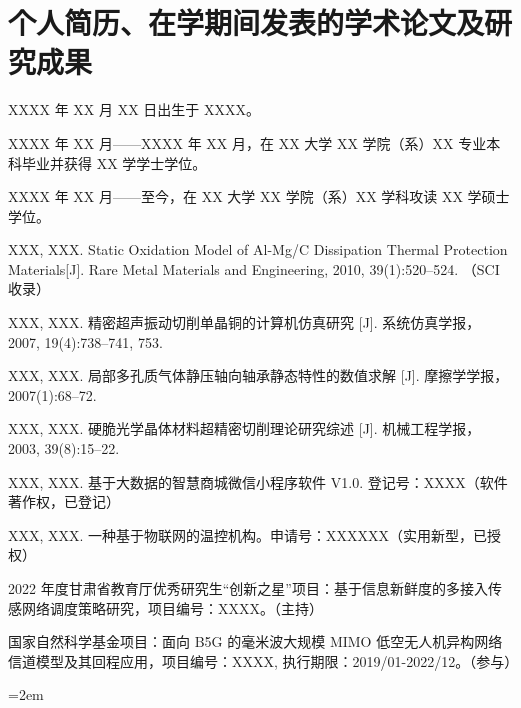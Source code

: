 \chapter*{个人简历、在学期间发表的学术论文及研究成果}
\setlength{\parindent}{0pt}
\vspace*{0.3em}
\begin{publist}
	\item XXXX 年 XX 月 XX 日出生于 XXXX。
	\item XXXX 年 XX 月——XXXX 年 XX 月，在 XX 大学 XX 学院（系）XX 专业本科毕业并获得 XX 学学士学位。
	\item XXXX 年 XX 月——至今，在 XX 大学 XX 学院（系）XX 学科攻读 XX 学硕士学位。
\end{publist}

\vspace*{0.3em}
\begin{publist}
	\item XXX, XXX. Static Oxidation Model of Al-Mg/C Dissipation Thermal Protection Materials[J]. Rare Metal Materials and Engineering, 2010, 39(1):520–524. （SCI 收录）
	\item XXX, XXX. 精密超声振动切削单晶铜的计算机仿真研究 [J]. 系统仿真学报，2007, 19(4):738–741, 753.
	\item XXX, XXX. 局部多孔质气体静压轴向轴承静态特性的数值求解 [J]. 摩擦学学报，2007(1):68–72.
	\item XXX, XXX. 硬脆光学晶体材料超精密切削理论研究综述 [J]. 机械工程学报，2003, 39(8):15–22.
\end{publist}
\vspace*{1em}
\vspace*{0.3em}
\begin{publist}
	\item XXX, XXX. 基于大数据的智慧商城微信小程序软件 V1.0. 登记号：XXXX（软件著作权，已登记）
	\item XXX, XXX. 一种基于物联网的温控机构。申请号：XXXXXX（实用新型，已授权）
\end{publist}
\vspace*{1em}
\vspace*{0.3em}
\begin{publist}
	\item	2022 年度甘肃省教育厅优秀研究生“创新之星”项目：基于信息新鲜度的多接入传感网络调度策略研究，项目编号：XXXX。（主持）
	\item	国家自然科学基金项目：面向 B5G 的毫米波大规模 MIMO 低空无人机异构网络信道模型及其回程应用，项目编号：XXXX, 执行期限：2019/01-2022/12。（参与）
\end{publist}
{}\hangindent=2em\noindent
